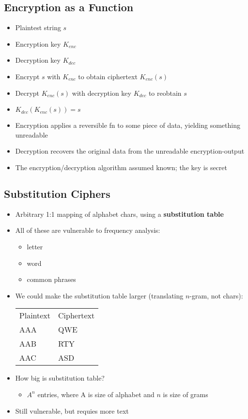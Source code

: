 \subsection{Encryption as a Function}
\begin{itemize}
	\item Plaintest string $s$
	\item Encryption key $K_{enc}$
	\item Decryption key $K_{dec}$
	\item Encrypt $s$ with $K_{enc}$ to obtain ciphertext $K_{enc}(s)$
	\item Decrypt $K_{enc}(s)$ with decryption key $K_{dec}$ to reobtain $s$
	\item $K_{dec}(K_{enc}(s))=s$
	\item Encryption applies a reversible fn to some piece of data, yielding something unreadable
	\item Decryption recovers the original data from the unreadable encryption-output
	\item The encryption/decryption algorithm assumed known; the key is secret
\end{itemize}

\subsection{Substitution Ciphers}
\begin{itemize}
	\item Arbitrary 1:1 mapping of alphabet chars, using a \textbf{substitution table}
	\item All of these are vulnerable to frequency analysis:
	\begin{itemize}
		\item letter
		\item word
		\item common phrases
	\end{itemize}
	\item We could make the substitution table larger (translating $n$-gram, not chars):
	\begin{center}\begin{tabular}{l|l}
		Plaintext & Ciphertext \\
		AAA & QWE \\
		AAB & RTY \\
		AAC & ASD
	\end{tabular}\end{center}
	\item How big is substitution table?
	\begin{itemize}
		\item $A^n$ entries, where A is size of alphabet and $n$ is size of grams
	\end{itemize}
	\item Still vulnerable, but requies more text
\end{itemize}

